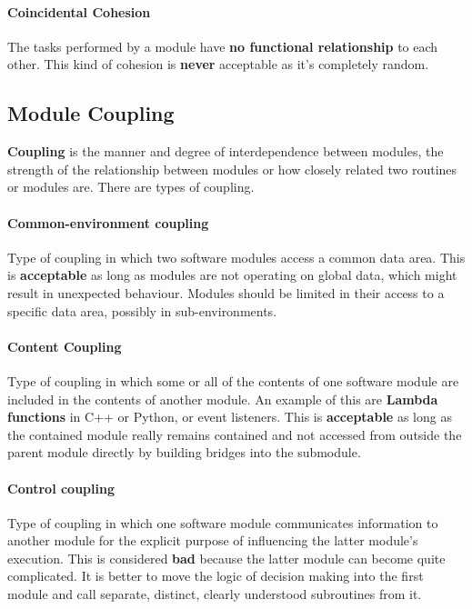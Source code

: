 \paragraph{Coincidental Cohesion} %
\label{par:coincidental_cohesion}
The tasks performed by a module have \textbf{no functional relationship} to each other.
This kind of cohesion is \textbf{never} acceptable as it's completely random.

\subsection{Module Coupling} %
\label{sub:module_coupling}
\textbf{Coupling} is the manner and degree of interdependence between modules, the strength of the relationship between modules or how closely related two routines or modules are.
There are types of coupling.

\paragraph{Common-environment coupling} %
\label{par:common_environment_coupling}
Type of coupling in which two software modules access a common data area.
This is \textbf{acceptable} as long as modules are not operating on global data, which might result in unexpected behaviour. Modules should be limited in their access to a specific data area, possibly in sub-environments.

\paragraph{Content Coupling} %
\label{par:content_coupling}
Type of coupling in which some or all of the contents of one software module are included in the contents of another module.
An example of this are \textbf{Lambda functions} in C++ or Python, or event listeners. This is \textbf{acceptable} as long as the contained module really remains contained and not accessed from outside the parent module directly by building bridges into the submodule.

\paragraph{Control coupling} %
\label{par:control_coupling}
Type of coupling in which one software module communicates information to another module for the explicit purpose of influencing the latter module's execution.
This is considered \textbf{bad} because the latter module can become quite complicated. It is better to move the logic of decision making into the first module and call separate, distinct, clearly understood subroutines from it.

